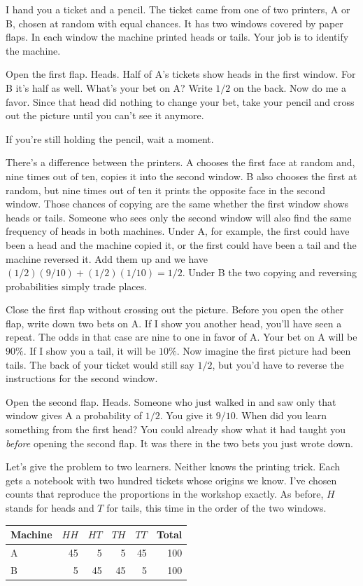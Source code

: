 I hand you a ticket and a pencil. The ticket came from one of two printers, A or B, chosen at random with equal chances. It has two windows covered by paper flaps. In each window the machine printed heads or tails. Your job is to identify the machine.

Open the first flap. Heads. Half of A's tickets show heads in the first window. For B it's half as well. What's your bet on A? Write $1/2$ on the back. Now do me a favor. Since that head did nothing to change your bet, take your pencil and cross out the picture until you can't see it anymore.

If you're still holding the pencil, wait a moment.

There's a difference between the printers. A chooses the first face at random and, nine times out of ten, copies it into the second window. B also chooses the first at random, but nine times out of ten it prints the opposite face in the second window. Those chances of copying are the same whether the first window shows heads or tails. Someone who sees only the second window will also find the same frequency of heads in both machines. Under A, for example, the first could have been a head and the machine copied it, or the first could have been a tail and the machine reversed it. Add them up and we have $(1/2)(9/10)+(1/2)(1/10)=1/2$. Under B the two copying and reversing probabilities simply trade places.

Close the first flap without crossing out the picture. Before you open the other flap, write down two bets on A. If I show you another head, you'll have seen a repeat. The odds in that case are nine to one in favor of A. Your bet on A will be $90\%$. If I show you a tail, it will be $10\%$. Now imagine the first picture had been tails. The back of your ticket would still say $1/2$, but you'd have to reverse the instructions for the second window.

Open the second flap. Heads. Someone who just walked in and saw only that window gives A a probability of $1/2$. You give it $9/10$. When did you learn something from the first head? You could already show what it had taught you \emph{before} opening the second flap. It was there in the two bets you just wrote down.

Let's give the problem to two learners. Neither knows the printing trick. Each gets a notebook with two hundred tickets whose origins we know. I've chosen counts that reproduce the proportions in the workshop exactly. As before, $H$ stands for heads and $T$ for tails, this time in the order of the two windows.
\begin{center}
\begin{tabular}{lrrrrr}
\toprule
Machine & $HH$ & $HT$ & $TH$ & $TT$ & Total \\
\midrule
A & 45 & 5 & 5 & 45 & 100 \\
B & 5 & 45 & 45 & 5 & 100 \\
\bottomrule
\end{tabular}
\end{center}

